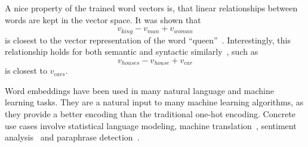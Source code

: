\documentclass[
        a4paper,
        titlepage,
        twoside,
        parskip
        ]{scrbook}
\theoremstyle{break}
\begin{document}
A nice property of the trained word vectors is, that linear relationships between words are kept in the vector space.
It was shown that
\begin{equation}
  v_{king} - v_{man} + v_{woman}
\end{equation}
is closest to the vector representation of the word ``queen''~\cite{Mikolov2013b}.
Interestingly, this relationship holds for both semantic and syntactic similarly~\cite{Mikolov2013a}, such as
\begin{equation}
  v_{houses} - v_{house} + v_{car}
\end{equation}
is closest to $v_{cars}$.

Word embeddings have been used in many natural language and machine learning tasks.
They are a natural input to many machine learning algorithms, as they provide a better encoding than the traditional one-hot encoding.
Concrete use cases involve statistical language modeling, machine translation~\cite{Zou2013}, sentiment analysis~\cite{Maas2011} and paraphrase detection~\cite{Mikolov2013a}.


\end{document}
